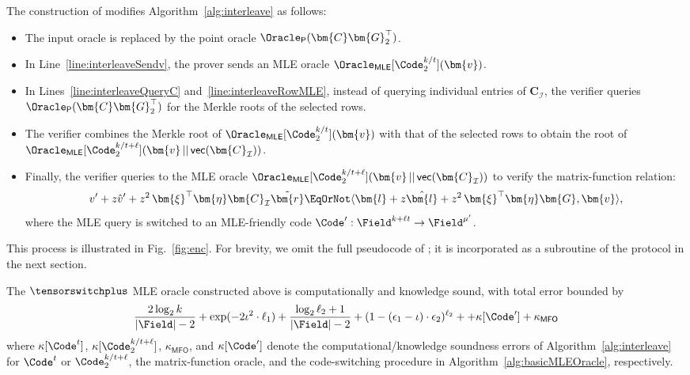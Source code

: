The construction of \tensorswitchplus modifies
Algorithm~\ref{alg:interleave} as follows:
\begin{itemize}
    \item The input oracle is replaced by the point oracle
    $\Oracle_{\mathsf{P}}(\bm{C}\bm{G}_2^\top)$.
    \item In Line~\ref{line:interleaveSendv}, the prover sends an MLE oracle
    $\Oracle_{\mathsf{MLE}}[\Code_2^{k/t}](\bm{v})$.
    \item In Lines~\ref{line:interleaveQueryC} and~\ref{line:interleaveRowMLE},
    instead of querying individual entries of $\bm{C}_{\mathcal{I}}$,
    the verifier queries $\Oracle_{\mathsf{P}}(\bm{C}\bm{G}_2^\top)$
    for the Merkle roots of the selected rows.
    \item The verifier combines the Merkle root of
    $\Oracle_{\mathsf{MLE}}[\Code_2^{k/t}](\bm{v})$
    with that of the selected rows to obtain the root of
    $\Oracle_{\mathsf{MLE}}[\Code_2^{k/t+\ell}]
    (\bm{v}\,||\,\mathsf{vec}(\bm{C}_{\mathcal{I}}))$.
    \item Finally, the verifier queries to the MLE oracle
    $\Oracle_{\mathsf{MLE}}[\Code_2^{k/t+\ell}]
    (\bm{v}\,||\,\mathsf{vec}(\bm{C}_{\mathcal{I}}))$ to verify the matrix-function relation:
    \[
        v' + z\hat{v}' + z^2\,\bm{\xi}^{\top}\bm{\eta}\bm{C}_{\mathcal{I}}\tilde{\bm{r}}
        \EqOrNot
        \langle
            \bm{l} + z\hat{\bm{l}} + z^2\,\bm{\xi}^{\top}\bm{\eta}\bm{G},
            \bm{v}
        \rangle,
    \]
    where the MLE query is switched to an MLE-friendly code
    $\Code':\Field^{k+\ell t}\to\Field^{\mu'}$.
\end{itemize}

This process is illustrated in Fig.~\ref{fig:enc}.
For brevity, we omit the full pseudocode of \tensorswitchplus;
it is incorporated as a subroutine of the \methodname protocol
in the next section.

\begin{theorem}
\label{theorem:tensorswitch}
The $\tensorswitchplus$ MLE oracle constructed above is computationally
and knowledge sound, with total error bounded by
\[
    \frac{2\log_2 k}{|\Field|-2} + \exp(-2\iota^2 \cdot \ell_1)  +  \frac{\log_2 \ell_2 +1}{|\Field|-2} + (1-(\epsilon_1 - \iota)\cdot \epsilon_2)^{\ell_2} +
    + \kappa[\Code']
    + \kappa_{\mathsf{MFO}}
\]
where $\kappa[\Code^{t}]$, $\kappa[\Code_2^{k/t+\ell}]$, $\kappa_{\mathsf{MFO}}$, and $\kappa[\Code']$
denote the computational/knowledge soundness errors of Algorithm~\ref{alg:interleave} for $\Code^t$ or $\Code_2^{k/t+\ell}$,
the matrix-function oracle, and the code-switching procedure
in Algorithm~\ref{alg:basicMLEOracle}, respectively.
\end{theorem}



